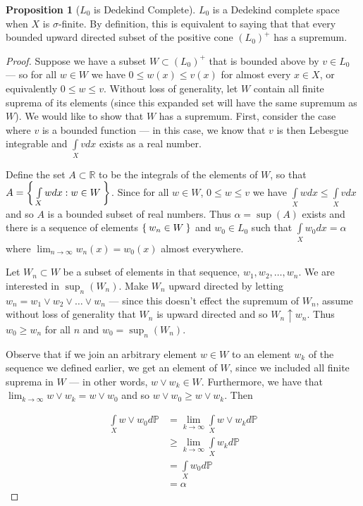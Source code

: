 \documentclass[letterpaper,10pt,oneside,onecolumn,reqno]{amsart}
\renewcommand{\P}{\mathbb P}
\newcommand{\R}{\mathbb R}
\theoremstyle{definition}
\newtheorem{pro}[thm]{Proposition}
\newcommand{\join}{\vee}
\begin{document}
\begin{pro}[$L_{0}$ is Dedekind Complete]\label{pro:5}
  $L_{0}$ is a Dedekind complete space when $X$ is $\sigma$-finite. By
  definition, this is equivalent to saying that that every bounded
  upward directed subset of the positive cone $(L_0)^+$ has a
  supremum.
\end{pro}

\begin{proof}
  Suppose we have a subset $W \subset (L_0)^+$ that is bounded above
  by $v \in L_0$ --- so for all $w \in W$ we have $0 \leq w(x) \leq
  v(x)$ for almost every $x \in X$, or equivalently $0 \leq w \leq
  v$. Without loss of generality, let $W$ contain all finite suprema
  of its elements (since this expanded set will have the same supremum
  as $W$). We would like to show that $W$ has a supremum. First,
  consider the case where $v$ is a bounded function --- in this case,
  we know that $v$ is then Lebesgue integrable and $\int\limits_X vdx$
  exists as a real number.

  Define the set $A \subset \R$ to be the integrals of the elements of
  $W$, so that $A = \Set{\int\limits_X w dx : w \in W}$. Since for all
  $w \in W$, $0 \leq w \leq v$ we have $\int\limits_X w dx \leq
  \int\limits_X v dx$ and so $A$ is a bounded subset of real
  numbers. Thus $\alpha = \sup(A)$ exists and there is a sequence of
  elements $\Set{w_n \in W}$ and $w_0 \in L_0$ such that
  $\int\limits_X w_0 dx = \alpha$ where $\lim_{n \to \infty}
  w_n(x)=w_{0}(x)$ almost everywhere.

  Let $W_n \subset W$ be a subset of elements in that sequence,
  $w_1,w_2,\dots,w_n$. We are interested in $\sup_n(W_n)$. Make $W_n$
  upward directed by letting $w_n = w_1 \join w_2 \join \dots \join
  w_n$ --- since this doesn't effect the supremum of $W_n$, assume
  without loss of generality that $W_n$ is upward directed and so $W_n
  \uparrow w_n$. Thus $w_0 \geq w_n$ for all $n$ and $w_0 =
  \sup_n(W_n)$.

  Observe that if we join an arbitrary element $w \in W$ to an element
  $w_k$ of the sequence we defined earlier, we get an element of $W$,
  since we included all finite suprema in $W$ --- in other words, $w
  \join w_k \in W$. Furthermore, we have that $\lim_{k \to \infty} w
  \join w_k = w \join w_0$ and so $w \join w_0 \geq w \join w_k$. Then

\begin{align*}
  \int\limits_X w \join w_0 d\P &= \lim_{k \to \infty}\int\limits_X w
  \join w_k d\P\\
  &\geq \lim_{k \to \infty} \int\limits_{X} w_k d\P\\
  &= \int\limits_X w_0 d\P\\
  &= \alpha
\end{align*}


\end{proof}
\end{document}
